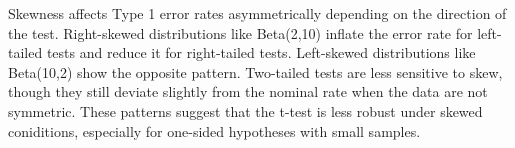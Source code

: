 \documentclass{article}\usepackage[]{graphicx}\usepackage[]{xcolor}
\begin{document}
\begin{enumerate}
\begin{enumerate}
Skewness affects Type 1 error rates asymmetrically depending on the direction of the test. Right-skewed distributions like Beta(2,10) inflate the error rate for left-tailed tests and reduce it for right-tailed tests. Left-skewed distributions like Beta(10,2) show the opposite pattern. Two-tailed tests are less sensitive to skew, though they still deviate slightly from the nominal rate when the data are not symmetric. These patterns suggest that the t-test is less robust under skewed coniditions, especially for one-sided hypotheses with small samples.

  \end{enumerate}
\end{enumerate}

\end{document}
